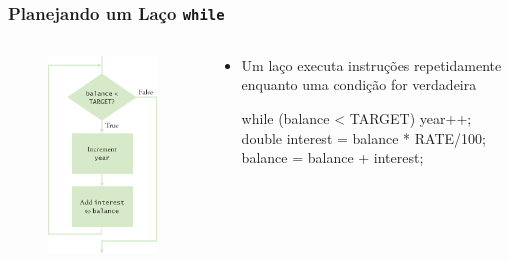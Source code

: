 \documentclass[xcolor={dvipsnames,table},aspectratio=169]{beamer}
\begin{document}
\begin{frame}[fragile]\frametitle{Planejando um Laço \texttt{while}}
\begin{columns}[T]
	\begin{column}{0.3\linewidth}
\begin{figure}[h]
	\includegraphics[height=0.65\paperheight,center]{pucrs-ep-fprog-unidade_04-lacos-laminas-fluxograma_laco.png}
\end{figure}
	\end{column}
	\begin{column}{0.7\linewidth}
		\begin{itemize}
		\item Um laço executa instruções repetidamente enquanto uma condição for verdadeira
\begin{javacode}
while (balance < TARGET) {
   year++;
   double interest = balance * RATE/100;
   balance = balance + interest;
}
\end{javacode}
		\end{itemize}
	\end{column}
\end{columns}
\end{frame}
\end{document}
